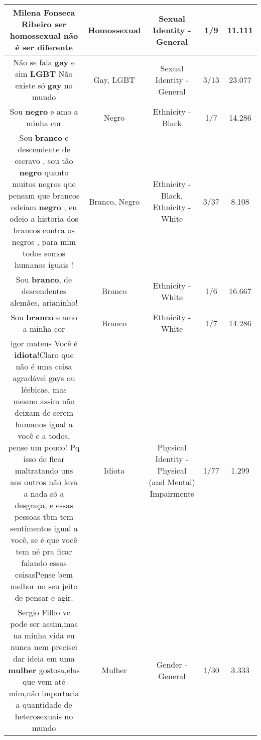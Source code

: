 \documentclass[11pt]{article}
\newlength\mylength
\begin{document}
\begin{center}
\begin{longtable}{|C{.65\mylength}|C{.30\mylength}|C{.12\mylength}|C{.12\mylength}|C{.12\mylength}|}
  \small Milena Fonseca Ribeiro ser \textbf{homossexual} não é ser diferente\normalsize   & Homossexual & Sexual Identity - General & 1/9 & 11.111 \\  \hline
  \small Não se fala \textbf{gay} e sim \textbf{LGBT} Não existe só \textbf{gay} no mundo\normalsize   & Gay, LGBT & Sexual Identity - General & 3/13 & 23.077 \\  \hline
  \small Sou \textbf{negro} e amo a minha cor\normalsize   & Negro & Ethnicity - Black & 1/7 & 14.286 \\  \hline
  \small Sou \textbf{branco} e descendente de escravo , sou tão \textbf{negro} quanto muitos negros que pensam que brancos odeiam \textbf{negro} , eu odeio a historia dos brancos contra os negros , para mim todos somos humanos iguais !\normalsize   & Branco, Negro & Ethnicity - Black, Ethnicity - White & 3/37 & 8.108 \\  \hline
  \small Sou \textbf{branco}, de descendentes alemães, arianinho!\normalsize   & Branco & Ethnicity - White & 1/6 & 16.667 \\  \hline
  \small Sou \textbf{branco} e amo a minha cor\normalsize   & Branco & Ethnicity - White & 1/7 & 14.286 \\  \hline
  \small igor mateus Você é \textbf{idiota}!Claro que não é uma coisa agradável gays ou lésbicas, mas mesmo assim não deixam de serem humanos igual a você e a todos, pense um pouco! Pq isso de ficar maltratando uns aos outros não  leva a nada só a desgraça, e essas pessoas tbm tem sentimentos igual a você, se é que você tem né pra ficar falando essas coisasPense bem melhor no seu jeito de pensar e agir.\normalsize   & Idiota & Physical Identity - Physical (and Mental) Impairments & 1/77 & 1.299 \\  \hline
  \small Sergio Filho vc pode ser assim,mas na minha vida eu nunca nem precisei dar ideia em uma \textbf{mulher} gostosa,elas  que vem até mim,não importaria a quantidade de heterosexuais no mundo\normalsize   & Mulher & Gender - General & 1/30 & 3.333 \\  \hline

\end{longtable}
\end{center}
\end{document}

